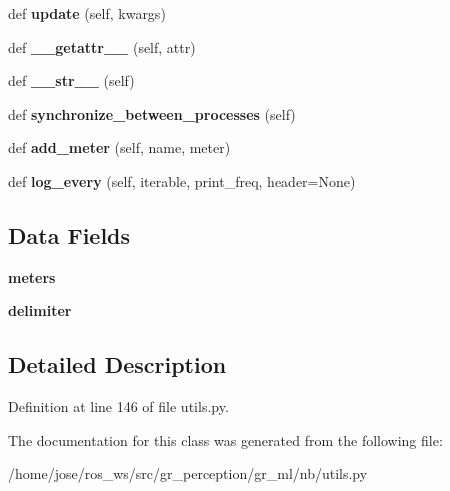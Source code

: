 \begin{DoxyCompactItemize}
\mbox{\label{classutils_1_1MetricLogger_a7ff577d15013ac9ad358428fd7e6ac77}} 
def {\bfseries update} (self, kwargs)
\item 
\mbox{\label{classutils_1_1MetricLogger_ac83dc82a4b7c2f4078fdbbc7d75ed18b}} 
def {\bfseries \+\_\+\+\_\+getattr\+\_\+\+\_\+} (self, attr)
\item 
\mbox{\label{classutils_1_1MetricLogger_a7dbbefdb1b1e47db288d2c3384af11fe}} 
def {\bfseries \+\_\+\+\_\+str\+\_\+\+\_\+} (self)
\item 
\mbox{\label{classutils_1_1MetricLogger_aceb85ddf415836087996c28d6ed54456}} 
def {\bfseries synchronize\+\_\+between\+\_\+processes} (self)
\item 
\mbox{\label{classutils_1_1MetricLogger_a7ca17a885a17883f5301ee3bbe1682f6}} 
def {\bfseries add\+\_\+meter} (self, name, meter)
\item 
\mbox{\label{classutils_1_1MetricLogger_a52307f8e0e7d7036cec2034cb19dcbea}} 
def {\bfseries log\+\_\+every} (self, iterable, print\+\_\+freq, header=None)
\end{DoxyCompactItemize}
\subsection*{Data Fields}
\begin{DoxyCompactItemize}
\item 
\mbox{\label{classutils_1_1MetricLogger_a2abd1647adef4676856867c831094251}} 
{\bfseries meters}
\item 
\mbox{\label{classutils_1_1MetricLogger_ae3c7a50a884ed3139ae0e81fd261cb7d}} 
{\bfseries delimiter}
\end{DoxyCompactItemize}


\subsection{Detailed Description}


Definition at line 146 of file utils.\+py.



The documentation for this class was generated from the following file\+:\begin{DoxyCompactItemize}
\item 
/home/jose/ros\+\_\+ws/src/gr\+\_\+perception/gr\+\_\+ml/nb/utils.\+py\end{DoxyCompactItemize}
